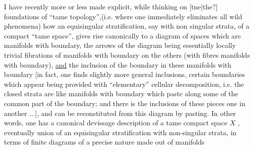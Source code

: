 \documentclass[11pt]{article}
\newcommand{\scanpage}[1]{\par\bigskip\noindent{\small\sffamily[scan #1]}\par}
\newcommand{\mspage}[1]{{\small\sffamily[p.\,#1]}}
\newcommand{\hand}[1]{\textcolor{blue}{#1}}
\newcommand{\uline}[1]{\underline{#1}}
\newcommand{\unsure}[1]{[#1?]}
\begin{document}
I have recently more or less made explicit, while thinking
on \unsure{tne|the} foundations of ``tame topology'',(i.e. where one immediately
eliminates all wild phenomena) how an equisingular stratification,
say with non singular strata, of a compact ``tame  space'', gives
rise canonically to a diagram of spaces which are manifolds with
boundary, the arrows of the diagram being essentially locally
trivial fibrations of manifolds with boundary on the others (with
fibres manifolds with boundary), \uline{and} the inclusion of the boundary
in these manifolds with boundary [in fact, one finds slightly
more general inclusions, certain boundaries which appear being
provided with ``elementary'' cellular decomposition, i.e. the
closed strata are like manifolds with boundary which paste along
some of the common part of the boundary; and there is
\hspace*{20em} the inclusions of these pieces
one in another ...], and can be reconstituted from this diagram
by pasting.  In other words, one has a canonical devissage
description of a tame compact space  $X$ , eventually union of an
equisingular stratification with non-singular strata, in terms
of finite diagrams of a precise nature made out of manifolds

\mspage{\hand{140}}

\clearpage
\scanpage{134-2/140}
\mspage{- 13 -}
\end{document}
